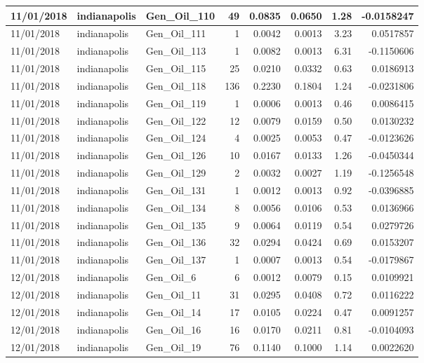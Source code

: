 \documentclass[
  letterpaper,
  DIV=11,
  numbers=noendperiod]{scrartcl}
\begin{document}
\begin{tabular}{l|l|l|r|r|r|r|r}
\hline
11/01/2018 & indianapolis & Gen\_Oil\_110 & 49 & 0.0835 & 0.0650 & 1.28 & -0.0158247\\
\hline
11/01/2018 & indianapolis & Gen\_Oil\_111 & 1 & 0.0042 & 0.0013 & 3.23 & 0.0517857\\
\hline
11/01/2018 & indianapolis & Gen\_Oil\_113 & 1 & 0.0082 & 0.0013 & 6.31 & -0.1150606\\
\hline
11/01/2018 & indianapolis & Gen\_Oil\_115 & 25 & 0.0210 & 0.0332 & 0.63 & 0.0186913\\
\hline
11/01/2018 & indianapolis & Gen\_Oil\_118 & 136 & 0.2230 & 0.1804 & 1.24 & -0.0231806\\
\hline
11/01/2018 & indianapolis & Gen\_Oil\_119 & 1 & 0.0006 & 0.0013 & 0.46 & 0.0086415\\
\hline
11/01/2018 & indianapolis & Gen\_Oil\_122 & 12 & 0.0079 & 0.0159 & 0.50 & 0.0130232\\
\hline
11/01/2018 & indianapolis & Gen\_Oil\_124 & 4 & 0.0025 & 0.0053 & 0.47 & -0.0123626\\
\hline
11/01/2018 & indianapolis & Gen\_Oil\_126 & 10 & 0.0167 & 0.0133 & 1.26 & -0.0450344\\
\hline
11/01/2018 & indianapolis & Gen\_Oil\_129 & 2 & 0.0032 & 0.0027 & 1.19 & -0.1256548\\
\hline
11/01/2018 & indianapolis & Gen\_Oil\_131 & 1 & 0.0012 & 0.0013 & 0.92 & -0.0396885\\
\hline
11/01/2018 & indianapolis & Gen\_Oil\_134 & 8 & 0.0056 & 0.0106 & 0.53 & 0.0136966\\
\hline
11/01/2018 & indianapolis & Gen\_Oil\_135 & 9 & 0.0064 & 0.0119 & 0.54 & 0.0279726\\
\hline
11/01/2018 & indianapolis & Gen\_Oil\_136 & 32 & 0.0294 & 0.0424 & 0.69 & 0.0153207\\
\hline
11/01/2018 & indianapolis & Gen\_Oil\_137 & 1 & 0.0007 & 0.0013 & 0.54 & -0.0179867\\
\hline
12/01/2018 & indianapolis & Gen\_Oil\_6 & 6 & 0.0012 & 0.0079 & 0.15 & 0.0109921\\
\hline
12/01/2018 & indianapolis & Gen\_Oil\_11 & 31 & 0.0295 & 0.0408 & 0.72 & 0.0116222\\
\hline
12/01/2018 & indianapolis & Gen\_Oil\_14 & 17 & 0.0105 & 0.0224 & 0.47 & 0.0091257\\
\hline
12/01/2018 & indianapolis & Gen\_Oil\_16 & 16 & 0.0170 & 0.0211 & 0.81 & -0.0104093\\
\hline
12/01/2018 & indianapolis & Gen\_Oil\_19 & 76 & 0.1140 & 0.1000 & 1.14 & 0.0022620\\

\end{tabular}
\end{document}
